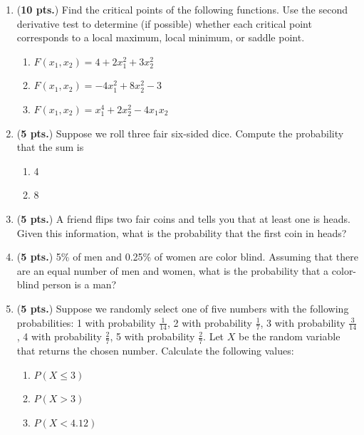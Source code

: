 \documentclass[13pt]{article}\usepackage[]{graphicx}\usepackage[]{color}
\begin{document}
{\begin{enumerate}
   \newpage 
   
    \item ({\bf 10 pts.})  Find the critical points of the following functions. Use the second derivative test to determine (if possible) whether each critical point corresponds to a local maximum, local minimum, or saddle point. 
  \begin{enumerate}
      \item $F(x_{1},x_{2}) = 4 + 2x_{1}^{2} + 3x_{2}^{2}$
      \item $F(x_{1},x_{2}) = -4x_{1}^{2}+8x_{2}^{2} - 3$
      \item $F(x_{1},x_{2}) = x_{1}^{4} + 2x_{2}^{2} - 4x_{1}x_{2}$
  \end{enumerate}
  
  \newpage
  
  \item ({\bf 5 pts.}) Suppose we roll three fair six-sided dice. Compute the probability that the sum is
  \begin{enumerate}
      \item 4
      \item 8
  \end{enumerate}
  
  \vspace{2.5in}
  
  \item  ({\bf 5 pts.}) A friend flips two fair coins and tells you that at least one is heads. Given this information, what is the probability that the first coin in heads? 
  
  \newpage 
  
  \item ({\bf 5 pts.}) 5\% of men and 0.25\% of women are color blind. Assuming that there are an equal number of men and women, what is the probability that a color-blind person is a man?
  
  \vspace{2.5in}
  
  \item ({\bf 5 pts.}) Suppose we randomly select one of five numbers with the following probabilities: 1 with probability $\frac{1}{14}$, 2 with probability $\frac{1}{7}$, 3 with probability $\frac{3}{14}$, 4 with probability $\frac{2}{7}$, 5 with probability $\frac{2}{7}$. Let $X$ be the random variable that returns the chosen number. Calculate the following values:
  \begin{enumerate}
      \item $P(X \leq 3)$
      \item $P(X > 3)$
      \item $P(X < 4.12 )$
  \end{enumerate}
  

\end{enumerate}}
\end{document}

